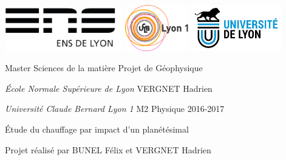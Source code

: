 \documentclass[10pt,a4paper]{article}
\author{Vergnet Hadrien}
\numberwithin{equation}{section}
\begin{document}
\begin{titlepage}
\thispagestyle{empty}
\setlength{\parindent}{0pt}

\includegraphics[height=1.9cm]{logo-ens.jpg} \hfill \includegraphics[height=2cm]{logo_lyon1.jpg} \hfill \includegraphics[height=2cm]{logo_univ_lyon.jpg}



Master Sciences de la matière
\hfill
Projet de Géophysique

\textit{École Normale Supérieure de Lyon}
\hfill
VERGNET Hadrien

\textit{Université Claude Bernard Lyon 1}
\hfill
M2 Physique 2016-2017

\vspace{0.5cm}

\hrulefill
\vspace{-0.6cm}

\hrulefill
\begin{center}\bfseries
\begin{huge}
Étude du chauffage par impact d'un planétésimal
\end{huge}
\Large
\vspace{0.4cm}

Projet réalisé par BUNEL Félix et VERGNET Hadrien
\end{center}
\hrulefill
\vspace{-0.6cm}

\hrulefill


\end{titlepage}
\end{document}
